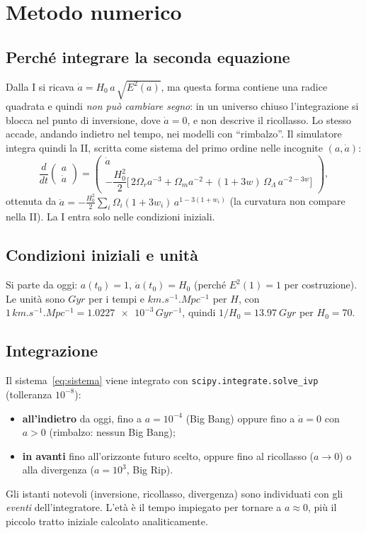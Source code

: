 \documentclass[11pt,a4paper]{article}
\newcommand{\Om}{\Omega_m}
\newcommand{\Or}{\Omega_r}
\newcommand{\OL}{\Omega_\Lambda}
\begin{document}
\section{Metodo numerico}

\subsection{Perché integrare la seconda equazione}
Dalla I si ricava $\dot a = H_0\,a\,\sqrt{E^2(a)}$, ma questa forma contiene una radice quadrata e quindi \emph{non può cambiare segno}: in un universo chiuso l'integrazione si blocca nel punto di inversione, dove $\dot a=0$, e non descrive il ricollasso. Lo stesso accade, andando indietro nel tempo, nei modelli con ``rimbalzo''.
Il simulatore integra quindi la II, scritta come sistema del primo ordine nelle incognite $(a,\dot a)$:
\begin{equation}
  \frac{d}{dt}\begin{pmatrix}a\\ \dot a\end{pmatrix} =
  \begin{pmatrix}\dot a\\[2pt] -\dfrac{H_0^2}{2}\Big[\,2\Or a^{-3} + \Om a^{-2} + (1+3w)\,\OL\, a^{-2-3w}\Big]\end{pmatrix},
  \label{eq:sistema}
\end{equation}
ottenuta da $\ddot a = -\tfrac{H_0^2}{2}\sum_i\Omega_i(1+3w_i)\,a^{1-3(1+w_i)}$ (la curvatura non compare nella II). La I entra solo nelle condizioni iniziali.

\subsection{Condizioni iniziali e unità}
Si parte da oggi: $a(t_0)=1$, $\dot a(t_0)=H_0$ (perché $E^2(1)=1$ per costruzione). Le unità sono $\si{Gyr}$ per i tempi e $\si{km.s^{-1}.Mpc^{-1}}$ per $H$, con $1\,\si{km.s^{-1}.Mpc^{-1}}=\num{1.0227e-3}\,\si{Gyr^{-1}}$, quindi $1/H_0=\SI{13.97}{Gyr}$ per $H_0=70$.

\subsection{Integrazione}
Il sistema~\eqref{eq:sistema} viene integrato con \texttt{scipy.integrate.solve\_ivp} (tolleranza $10^{-8}$):
\begin{itemize}
  \item \textbf{all'indietro} da oggi, fino a $a=10^{-4}$ (Big Bang) oppure fino a $\dot a=0$ con $a>0$ (rimbalzo: nessun Big Bang);
  \item \textbf{in avanti} fino all'orizzonte futuro scelto, oppure fino al ricollasso ($a\to0$) o alla divergenza ($a=10^3$, Big Rip).
\end{itemize}
Gli istanti notevoli (inversione, ricollasso, divergenza) sono individuati con gli \emph{eventi} dell'integratore. L'età è il tempo impiegato per tornare a $a\approx0$, più il piccolo tratto iniziale calcolato analiticamente.
\end{document}
